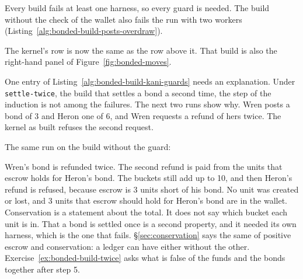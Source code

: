 
Every build fails at least one harness, so every guard is needed. The
build without the check of the wallet also fails the run with two workers
(Listing~\ref{alg:bonded-build-posts-overdraw}).


The kernel's row is now the same as the row above it. That build is also
the right-hand panel of Figure~\ref{fig:bonded-moves}.

One entry of Listing~\ref{alg:bonded-build-kani-guards} needs an
explanation. Under \texttt{settle-twice}, the build that settles a bond a
second time, the step of the induction is not among the failures. The
next two runs show why. Wren posts a bond of 3 and Heron one of 6, and
Wren requests a refund of hers twice. The kernel as built refuses the
second request.


The same run on the build without the guard:


Wren's bond is refunded twice. The second refund is paid from the units
that escrow holds for Heron's bond. The buckets still add up to 10, and
then Heron's refund is refused, because escrow is 3 units short of his
bond. No unit was created or lost, and 3 units that escrow should hold for
Heron's bond are in the wallet. Conservation is a statement about the
total. It does not say which bucket each unit is in. That a bond is
settled once is a second property, and it needed its own harness, which is
the one that fails. \S\ref{sec:conservation} says the same of positive
escrow and conservation: a ledger can have either without the other.
Exercise~\ref{ex:bonded-build-twice} asks what is false of the funds and
the bonds together after step 5.

